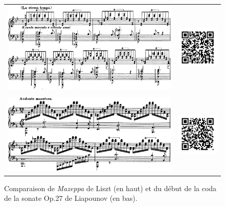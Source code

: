 \begin{figure}[!p]
  \begin{bigcenter}
    \begin{tabular}{lr}
      \vspace*{0.0cm}
      \includegraphics[width=12.5cm, keepaspectratio]{mazeppa.png}
      &
      \includegraphics[width=3cm, keepaspectratio]{mazeppa-qr.png}
      \\
      \vspace{0.5cm} &
      \\
      \includegraphics[width=12.5cm, keepaspectratio]{sonate-coda.png}
      &
      \includegraphics[width=3cm, keepaspectratio]{sonate-qr.png}
    \end{tabular}
  \end{bigcenter}
  \caption{\label{mazeppa}Comparaison de \emph{Mazeppa} de Liszt (en haut) et du début de la coda de la sonate Op.27 de Liapounov (en bas).}
\end{figure}

